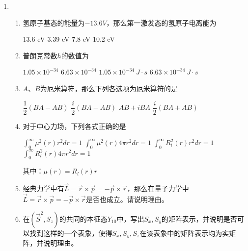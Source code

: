 

\begin{enumerate}
	\item
\begin{enumerate}
	\item
氢原子基态的能量为$-13.6V$，那么第一激发态的氢原子电离能为  

\fourchoices
{13.6 eV}
{3.39 eV}
{7.8 eV}
{10.2 eV}


\item 
普朗克常数$h$的数值为  

\fourchoices
{$1.05\times10^{-34} $}
{$6.63\times10^{-34}  $}
{$1.05\times10^{-34} \ J \cdot s  $}
{$6.63\times10^{-34} \ J \cdot s $}

\item 
$ A $、$ B $为厄米算符，那么下列各选项为厄米算符的是  

\fourchoices
{$\dfrac{1}{2}(BA-AB) $}
{$\dfrac{i}{2}(BA-AB) $}
{$AB+iBA $}
{$\dfrac{i}{2}(BA+AB)$}

\item 
对于中心力场，下列各式正确的是  


\fourchoices
{$\int_{0}^{\infty} \mu^{2}(r) r^{2} d r=1$}
{$ \int_{0}^{\infty} \mu^{2} (r) 4 \pi r^{2} d r=1$}
{$\int_{0}^{\infty} R_{l}^{2}(r) r^{2} d r=1$}
{$\int_{0}^{\infty} R_{l}^{2}(r) 4 \pi r^{2} d r=1$}




其中：$\mu{(r)}=R_l(r)r$

\item 经典力学中有$\vec{L}=\vec{r}\times\vec{p}=-\vec{p}\times \vec{r}$，那么在量子力学中$\vec{L}=\vec{r}\times\vec{p}=-\vec{p}\times \vec{r}$是否也成立。请说明理由。




\item 
在$(\vec{S}^2,S_z)$的共同的本征态$ Y_{10} $中，写出$S_x,S_y$的矩阵表示，并说明是否可以找到这样的一个表象，使得$S_x,S_y,S_z$在该表象中的矩阵表示均为实矩阵，并说明理由。


\end{enumerate}
\end{enumerate}
